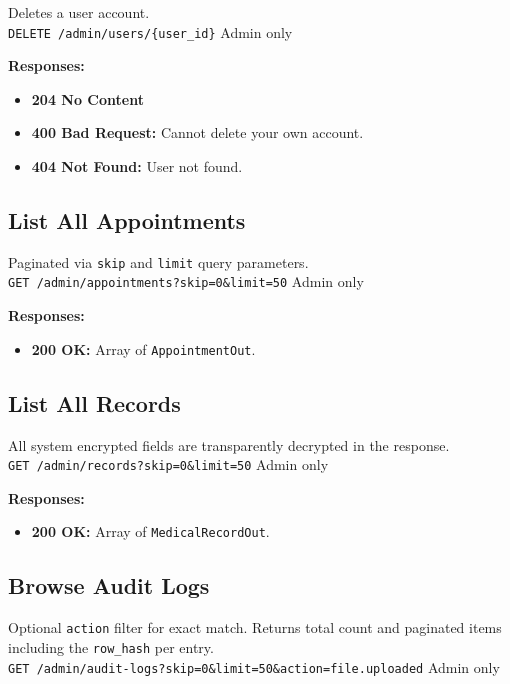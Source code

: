 \documentclass[a4paper,12pt]{report}
\begin{document}
Deletes a user account. \\
\texttt{DELETE /admin/users/\{user\_id\}} \hfill Admin only

\noindent\textbf{Responses:}
\begin{itemize}
    \item \textbf{204 No Content}
    \item \textbf{400 Bad Request:} Cannot delete your own account.
    \item \textbf{404 Not Found:} User not found.
\end{itemize}

\subsection{List All Appointments}

Paginated via \texttt{skip} and \texttt{limit} query parameters. \\
\texttt{GET /admin/appointments?skip=0\&limit=50} \hfill Admin only

\noindent\textbf{Responses:}
\begin{itemize}
    \item \textbf{200 OK:} Array of \texttt{AppointmentOut}.
\end{itemize}

\subsection{List All Records}

All system encrypted fields are transparently decrypted in the response. \\
\texttt{GET /admin/records?skip=0\&limit=50} \hfill Admin only

\noindent\textbf{Responses:}
\begin{itemize}
    \item \textbf{200 OK:} Array of \texttt{MedicalRecordOut}.
\end{itemize}

\subsection{Browse Audit Logs}

Optional \texttt{action} filter for exact match. Returns total count and paginated items including the \texttt{row\_hash} per entry. \\
\texttt{GET /admin/audit-logs?skip=0\&limit=50\&action=file.uploaded} \hfill Admin only
\end{document}
